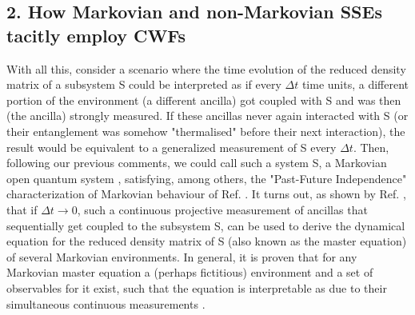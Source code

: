\documentclass[11pt, a4paper]{article} %
\begin{document}
\subsection*{2. How Markovian and non-Markovian SSEs tacitly employ CWFs}\vspace{-0.15cm}
With all this, consider a scenario where the time evolution of the reduced density matrix of a subsystem S could be interpreted as if every $\Delta t$ time units, a different portion of the environment (a different ancilla) got coupled with S and was then (the ancilla) strongly measured. If these ancillas never again interacted with S (or their entanglement was somehow "thermalised" before their next interaction), the result would be equivalent to a generalized measurement of S every $\Delta t$. Then, following our previous comments, we could call such a system S, a Markovian open quantum system \cite{QuantumTrajs}, satisfying, among others, the "Past-Future Independence" characterization of Markovian behaviour of Ref. \cite{MarkovianityDefs}. It turns out, as shown by Ref. \cite{continousMeas}, that if $\Delta t\rightarrow 0$, such a continuous projective measurement of ancillas that sequentially get coupled to the subsystem S, can be used to derive the dynamical equation for the reduced density matrix of S (also known as the master equation) of several Markovian environments. In general, it is proven that for any Markovian master equation a (perhaps fictitious) environment and a set of observables for it exist, such that the equation is interpretable as due to their simultaneous continuous measurements \cite{continousMeas, MarkovianityDefs}.
\end{document}
